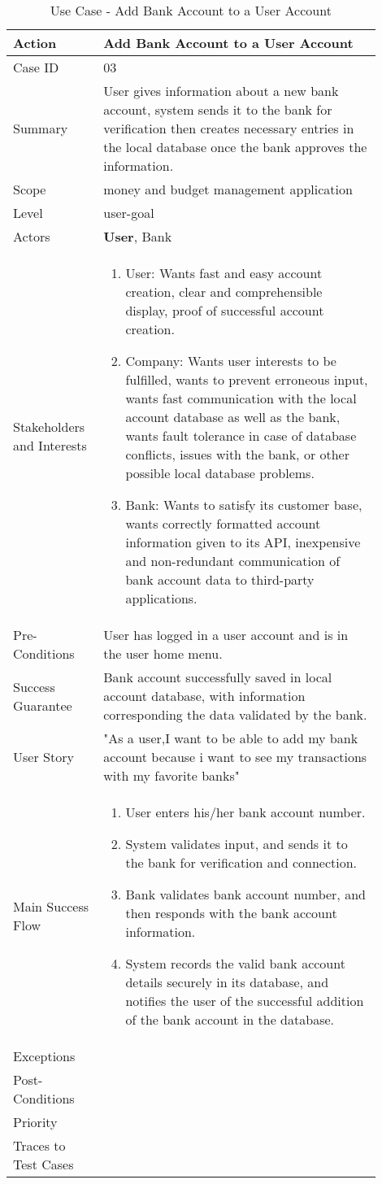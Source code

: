 \documentclass[11pt]{article}
\newcounter{use case ID}
\newcommand\tabularhead[1]{
\begin{table}[ht]
    \addtocounter{use case ID}{1}
    \caption{Use Case \arabic{use case ID} - #1}
    \vspace{0.2cm}
    \begin{tabular}{|p{0.2\linewidth}|p{0.70\linewidth}|}
    \hline
        \textbf{Action} & \textbf{#1} \\
        \hline}
\newcommand\addrow[2]{#1 & #2\\ \hline}
\newcommand\addmulrow[2]{ \begin{minipage}[t][][t]{2.5cm}#1\end{minipage}
        &\begin{minipage}[t][][t]{11cm}
        \begin{enumerate}[itemsep=-1ex] #2   \end{enumerate}
    \end{minipage}\vfill\\ \hline}
\newenvironment{usecase}{\tabularhead}
{\hline\end{tabular}\end{table}}
\begin{document}
\begin{usecase}{Add Bank Account to a User Account}
    \addrow{Case ID}{03}
    \addrow{Summary}{User gives information about a new bank account, system sends it to the bank for verification then creates necessary entries in the local database once the bank approves the information.}
    \addrow{Scope}{money and budget management application}
    \addrow{Level}{user-goal}
    \addrow{Actors}{\textbf{User}, Bank}
    \addmulrow{Stakeholders and Interests}{
        \item User: Wants fast and easy account creation, clear and comprehensible display, proof of successful account creation.
        \item Company: Wants user interests to be fulfilled, wants to prevent erroneous input, wants fast communication with the local account database as well as the bank, wants fault tolerance in case of database conflicts, issues with the bank, or other possible local database problems.
        \item Bank: Wants to satisfy its customer base, wants correctly formatted account information given to its API, inexpensive and non-redundant communication of bank account data to third-party applications.}
    \addrow{Pre-Conditions}{User has logged in a user account and is in the user home menu.}
    \addrow{Success Guarantee}{Bank account successfully saved in local account database, with information corresponding the data validated by the bank.}
    \addrow{User Story} {"As a user,I want to be able to add my bank account because i want to see my transactions with my favorite banks"}
    \addmulrow{Main Success Flow}{
        \item User enters his/her bank account number.
        \item System validates input, and sends it to the bank for verification and connection.
        \item Bank validates bank account number, and then responds with the bank account information.
        \item System records the valid bank account details securely in its database, and notifies the user of the successful addition of the bank account in the database.}
    \addrow{Exceptions}{}
    \addrow{Post-Conditions}{}
    \addrow{Priority}{}
    \addrow{Traces to Test Cases}{}
\end{usecase}
\end{document}
